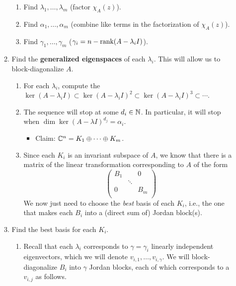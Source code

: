 \documentclass[../notes.tex]{subfiles}
\begin{document}
\begin{itemize}
\begin{enumerate}
\begin{enumerate}
            \item Find $\lambda_1,\dots,\lambda_m$ (factor $\chi_A(z)$).
            \item Find $\alpha_1,\dots,\alpha_m$ (combine like terms in the factorization of $\chi_A(z)$).
            \item Find $\gamma_1,\dots,\gamma_m$ ($\gamma_i=n-\rank(A-\lambda_iI)$).
        \end{enumerate}
        \item Find the \textbf{generalized eigenspaces} of each $\lambda_i$. This will allow us to block-diagonalize $A$.
        \begin{enumerate}
            \item For each $\lambda_i$, compute the $\ker(A-\lambda_iI)\subset\ker(A-\lambda_iI)^2\subset\ker(A-\lambda_iI)^3\subset\cdots$.
            \item The sequence will stop at some $d_i\in\mathbb{N}$. In particular, it will stop when $\dim\ker(A-\lambda I)^{d_j}=\alpha_i$.
            \begin{itemize}
                \item Claim: $\mathbb{C}^n=K_1\oplus\cdots\oplus K_m$.
            \end{itemize}
            \item Since each $K_i$ is an invariant subspace of $A$, we know that there is a matrix of the linear transformation corresponding to $A$ of the form
            \begin{equation*}
                \begin{pmatrix}
                    B_1 &  & 0\\
                     & \ddots & \\
                    0 &  & B_m\\
                \end{pmatrix}
            \end{equation*}
            We now just need to choose the \emph{best} basis of each $K_i$, i.e., the one that makes each $B_i$ into a (direct sum of) Jordan block(s).
        \end{enumerate}
        \item Find the best basis for each $K_i$.
        \begin{enumerate}
            \item Recall that each $\lambda_i$ corresponds to $\gamma=\gamma_i$ linearly independent eigenvectors, which we will denote $v_{i,1},\dots,v_{i,\gamma}$. We will block-diagonalize $B_i$ into $\gamma$ Jordan blocks, each of which corresponds to a $v_{i,j}$ as follows.\par

\end{enumerate}
\end{enumerate}
\end{itemize}
\end{document}

